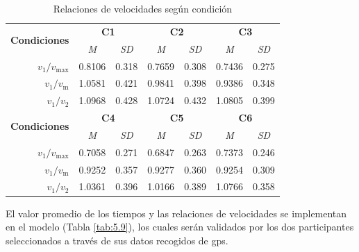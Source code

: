 \begin{table}[h]
\centering
\begin{tabular}{@{}rccccclc@{}}
\multirow{2}{*}{\textbf{Condiciones}} & \multicolumn{2}{c}{\textbf{C1}} & \multicolumn{2}{c}{\textbf{C2}} & \multicolumn{3}{c}{\textbf{C3}}                  \\ \cmidrule(l){2-8} 
                                      & \textit{M}     & \textit{SD}    & \textit{M}     & \textit{SD}    & \multicolumn{2}{c}{\textit{M}} & \textit{SD}     \\ \midrule
$v_1/v_{\text{max}}$                             & 0.8106         & 0.318          & 0.7659         & 0.308          & \multicolumn{2}{c}{0.7436}     & 0.275           \\ \midrule
$v_1/v_{\text{m}}$                               & 1.0581         & 0.421          & 0.9841         & 0.398          & \multicolumn{2}{c}{0.9386}     & 0.348           \\ \midrule
$v_1/v_2$                               & 1.0968         & 0.428          & 1.0724         & 0.432          & \multicolumn{2}{c}{1.0805}     & 0.399           \\ \midrule
\multirow{2}{*}{\textbf{Condiciones}} & \multicolumn{2}{c}{\textbf{C4}} & \multicolumn{2}{c}{\textbf{C5}} & \multicolumn{3}{c}{\textbf{C6}}                  \\ \cmidrule(l){2-8} 
                                      & \textit{M}     & \textit{SD}    & \textit{M}     & \textit{SD}    & \multicolumn{2}{c}{\textit{M}} & \textit{SD}     \\ \midrule
$v_1/v_{\text{max}}$                              & 0.7058         & 0.271          & 0.6847         & 0.263          & \multicolumn{2}{c}{0.7373}     & 0.246           \\ \midrule
$v_1/v_{\text{m}}$                              & 0.9252         & 0.357          & 0.9277         & 0.360          & \multicolumn{2}{c}{0.9254}     & 0.309           \\ \midrule
$v_1/v_2$                               & 1.0361         & 0.396          & 1.0166         & 0.389          & \multicolumn{2}{c}{1.0766}     & 0.358          \\ \bottomrule
\end{tabular}
\caption{Relaciones de velocidades según condición}
\label{tab:5.8}
\end{table}

El valor promedio de los tiempos y las relaciones de velocidades se implementan en el modelo (Tabla \ref{tab:5.9}), los cuales serán validados por los dos participantes seleccionados a través de sus datos recogidos de \gls{gps}. 

